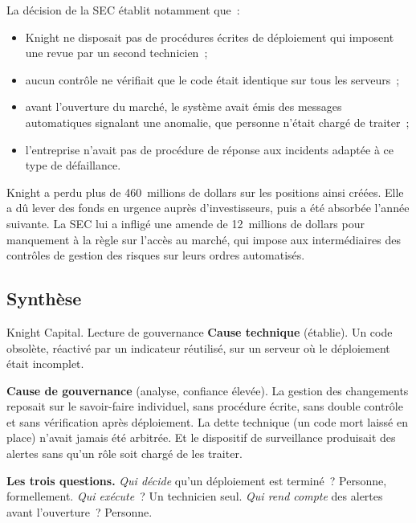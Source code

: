 La décision de la SEC établit notamment que~:
\begin{itemize}
    \item Knight ne disposait pas de procédures écrites de déploiement qui
          imposent une revue par un second technicien~;
    \item aucun contrôle ne vérifiait que le code était identique sur tous
          les serveurs~;
    \item avant l'ouverture du marché, le système avait émis des messages
          automatiques signalant une anomalie, que personne n'était chargé
          de traiter~;
    \item l'entreprise n'avait pas de procédure de réponse aux incidents
          adaptée à ce type de défaillance.
\end{itemize}
Knight a perdu plus de 460~millions de dollars sur les positions ainsi
créées. Elle a dû lever des fonds en urgence auprès d'investisseurs, puis
a été absorbée l'année suivante. La SEC lui a infligé une amende de
12~millions de dollars pour manquement à la règle sur l'accès au marché,
qui impose aux intermédiaires des contrôles de gestion des risques sur
leurs ordres automatisés.

\subsection{Synthèse}

\begin{boxscenario}{Knight Capital. Lecture de gouvernance}
\textbf{Cause technique} (établie). Un code obsolète, réactivé par un
indicateur réutilisé, sur un serveur où le déploiement était incomplet.

\medskip
\textbf{Cause de gouvernance} (analyse, confiance élevée). La gestion des
changements reposait sur le savoir-faire individuel, sans procédure
écrite, sans double contrôle et sans vérification après déploiement. La
dette technique (un code mort laissé en place) n'avait jamais été
arbitrée. Et le dispositif de surveillance produisait des alertes sans
qu'un rôle soit chargé de les traiter.

\medskip
\textbf{Les trois questions.} \emph{Qui décide} qu'un déploiement est
terminé~? Personne, formellement. \emph{Qui exécute}~? Un technicien seul.
\emph{Qui rend compte} des alertes avant l'ouverture~? Personne.
\end{boxscenario}

